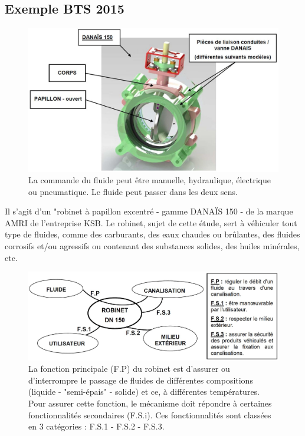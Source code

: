\documentclass[
	11pt, %
	fleqn, %
	a4paper, %
]{LegrandOrangeBook}
\begin{document}
\subsection{Exemple BTS 2015}

\begin{figure}[H] %
	\centering %
	\includegraphics[width=1\textwidth]{Images/2015A.JPG} %
	\caption{La commande du fluide peut être manuelle, hydraulique, électrique ou pneumatique. Le fluide peut passer dans les deux sens.}
	\label{2015A} %
\end{figure}

Il s'agit d'un "robinet à papillon excentré - gamme DANAÏS 150 - de la marque
AMRI de l'entreprise KSB. Le robinet, sujet de cette étude, sert à véhiculer tout type de fluides, comme des
carburants, des eaux chaudes ou brûlantes, des fluides corrosifs et/ou agressifs ou
contenant des substances solides, des huiles minérales, etc.


\begin{figure}[H] %
	\centering %
	\includegraphics[width=1\textwidth]{Images/2015.JPG} %
	\caption{La fonction principale (F.P) du robinet est d'assurer ou d’interrompre le passage de fluides de différentes compositions (liquide - "semi-épais" - solide) et ce, à différentes températures. Pour assurer cette fonction, le mécanisme doit répondre à certaines fonctionnalités secondaires (F.S.i). Ces fonctionnalités sont classées en 3 catégories : F.S.1 - F.S.2 - F.S.3.}
	\label{2015} %
\end{figure}
\end{document}
